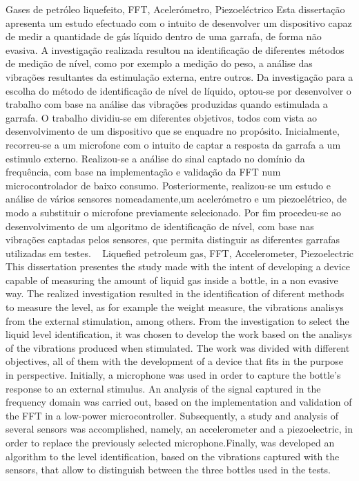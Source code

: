 \TitlePage
  \vspace*{55mm}
       {Gases de petróleo liquefeito, FFT, Acelerómetro, Piezoeléctrico}
       {Esta dissertação apresenta um estudo efectuado com o intuito de desenvolver um dispositivo capaz de medir a quantidade de gás líquido dentro de uma garrafa, de forma não evasiva. A investigação realizada resultou na identificação de diferentes métodos de medição de nível, como por exemplo a medição do peso, a análise das vibrações resultantes da estimulação externa, entre outros. Da investigação para a escolha do método de identificação de nível de líquido, optou-se por desenvolver o trabalho com base na análise das vibrações produzidas quando estimulada a garrafa.}
  \TEXT{}
       {O trabalho dividiu-se em diferentes objetivos, todos com vista ao desenvolvimento de um dispositivo que se enquadre no propósito. Inicialmente, recorreu-se a um microfone com o intuito de captar a resposta da garrafa a um estimulo externo. Realizou-se a análise do sinal captado no domínio da frequência, com base na implementação e validação da FFT num microcontrolador de baixo consumo. Posteriormente, realizou-se um estudo e análise de vários sensores nomeadamente,um acelerómetro e um piezoelétrico, de modo a substituir o microfone previamente selecionado. Por fim procedeu-se ao desenvolvimento de um algoritmo de identificação de nível, com base nas vibrações captadas pelos sensores, que permita distinguir as diferentes garrafas utilizadas em testes.} 
\EndTitlePage
\titlepage\ \endtitlepage %
\TitlePage
  \vspace*{55mm}
       {Liquefied petroleum gas, FFT, Accelerometer, Piezoelectric}
       {This dissertation presentes the study made with the intent of developing a device capable of measuring the amount of liquid gas inside a bottle, in a non evasive way. The realized investigation resulted in the identification of diferent methods to measure the level, as for example the weight measure, the vibrations analisys from the external stimulation, among others. From the investigation to select the liquid level identification, it was chosen to develop the work based on the analisys of the vibrations produced when stimulated.}
  \TEXT{}
       {The work was divided with different objectives, all of them with the development of a device that fits in the purpose in perspective. Initially, a microphone was used in order to capture the bottle's response to an external stimulus. An analysis of the signal captured in the frequency domain was carried out, based on the implementation and validation of the FFT in a low-power microcontroller. Subsequently, a study and analysis of several sensors was accomplished, namely, an accelerometer and a piezoelectric, in order to replace the previously selected microphone.Finally, was developed an algorithm to the level identification, based on the vibrations captured with the sensors, that allow to distinguish between the three bottles used in the tests.}
\EndTitlePage
\titlepage\ \endtitlepage %
